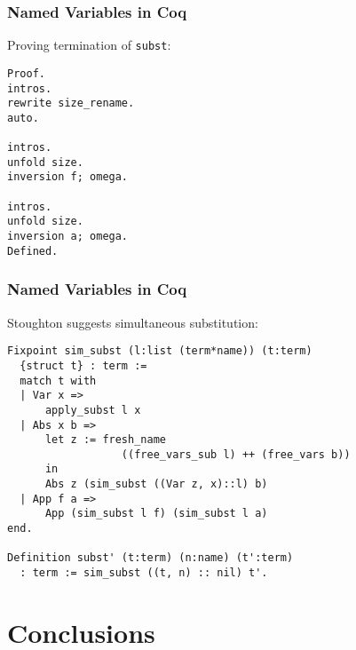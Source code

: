 \documentclass[notheorems]{beamer}
\begin{document}
\begin{frame}[fragile]

  \frametitle{Named Variables in Coq}

  Proving termination of \texttt{subst}:
  \begin{lstlisting}
Proof.
intros.
rewrite size_rename.
auto.

intros.
unfold size.
inversion f; omega.

intros.
unfold size.
inversion a; omega.
Defined.
  \end{lstlisting}

\end{frame}


\begin{frame}[fragile]

  \frametitle{Named Variables in Coq}

  Stoughton suggests simultaneous substitution:
  \begin{lstlisting}
Fixpoint sim_subst (l:list (term*name)) (t:term)
  {struct t} : term :=
  match t with
  | Var x =>
      apply_subst l x
  | Abs x b =>
      let z := fresh_name
                  ((free_vars_sub l) ++ (free_vars b))
      in
      Abs z (sim_subst ((Var z, x)::l) b)
  | App f a =>
      App (sim_subst l f) (sim_subst l a)
end.

Definition subst' (t:term) (n:name) (t':term)
  : term := sim_subst ((t, n) :: nil) t'.
  \end{lstlisting}

\end{frame}


\section{Conclusions}




\end{document}
